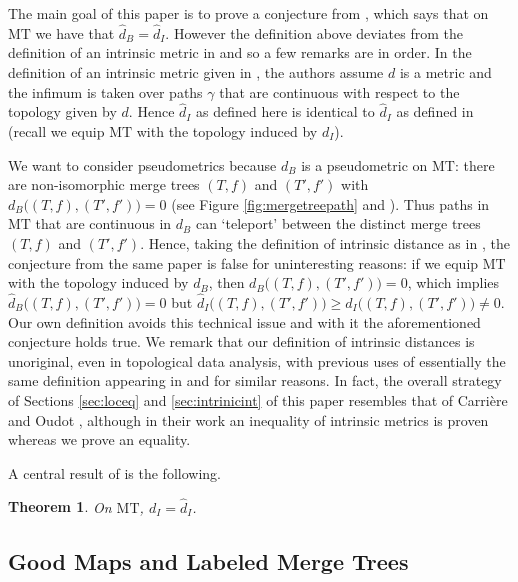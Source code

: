 \documentclass{article}
\newtheorem{theorem}{Theorem}
\theoremstyle{definition}
\newcommand{\MT}{\mathrm{MT}}
\begin{document}
The main goal of this paper is to prove a conjecture from \cite{gasparovic2025intrinsic}, which says that on $\MT$ we have that $\widehat{d}_B = \widehat{d}_I$. However the definition above deviates from the definition of an intrinsic metric in \cite{gasparovic2025intrinsic} and so a few remarks are in order. In the definition of an intrinsic metric given in \cite{gasparovic2025intrinsic}, the authors assume $d$ is a metric and the infimum is taken over paths $\gamma$ that are continuous with respect to the topology given by $d$. Hence $\widehat{d}_I$ as defined here is identical to $\widehat{d}_I$ as defined in \cite{gasparovic2025intrinsic} (recall we equip $\MT$ with the topology induced by $d_I$).

We want to consider pseudometrics because $d_B$ is a pseudometric on $\MT$: there are non-isomorphic merge trees $(T,f)$ and $(T',f')$ with $d_B\big((T,f),(T',f')\big)=0$ (see Figure \ref{fig:mergetreepath} and \cite{curry2018fiber}). Thus paths in $\MT$ that are continuous in $d_B$ can `teleport' between the distinct merge trees $(T,f)$ and $(T',f')$. Hence, taking the definition of intrinsic distance as in \cite{gasparovic2025intrinsic}, the conjecture from the same paper is false for uninteresting reasons: if we equip $\MT$ with the topology induced by $d_B$, then $d_B\big((T,f),(T',f')\big)=0$, which implies $\widehat{d}_B\big((T,f),(T',f')\big)=0$ but $\widehat{d}_I\big((T,f),(T',f')\big) \geq d_I\big((T,f),(T',f')\big) \neq 0$. Our own definition avoids this technical issue and with it the aforementioned conjecture holds true. We remark that our definition of intrinsic distances is unoriginal, even in topological data analysis, with previous uses of essentially the same definition appearing in \cite{Carrire2017LocalEA} and \cite{vipond2020local} for similar reasons. In fact, the overall strategy of Sections \ref{sec:loceq} and \ref{sec:intrinicint} of this paper resembles that of Carri\`{e}re and Oudot \cite{Carrire2017LocalEA}, although in their work an inequality of intrinsic metrics is proven whereas we prove an equality.

A central result of \cite{gasparovic2025intrinsic} is the following.

\begin{theorem}\label{thm:dI}
    \label{prop:intrinsicinterleaving}
    On $\MT$, $d_I =\widehat{d}_I$.
\end{theorem}

\subsection{Good Maps and Labeled Merge Trees}
\end{document}
